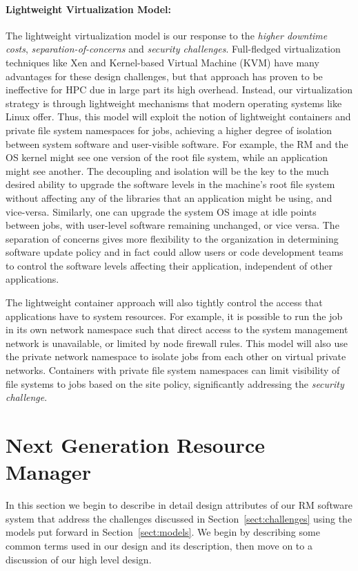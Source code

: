 \documentclass{article}
\begin{document}
\paragraph{Lightweight Virtualization Model:}
The lightweight virtualization model is our response to 
the {\sl higher downtime costs}, {\sl separation-of-concerns} and
{\sl security challenges}. Full-fledged virtualization techniques like Xen and
Kernel-based Virtual Machine (KVM) have many advantages for these design challenges, but
that approach has proven to be ineffective for HPC due in large part
its high overhead. Instead, our virtualization strategy is through lightweight
mechanisms that modern operating systems like Linux offer.  Thus,
this model will exploit the notion of lightweight containers and private
file system namespaces for jobs, achieving a higher degree of isolation
between system software and user-visible software. For example, the RM
and the OS kernel might see one version of the root file system, while
an application might see another. The decoupling and isolation will be
the key to the much desired ability to upgrade the software levels in the
machine's root file system without affecting any of the libraries that
an application might be using, and vice-versa. Similarly, one can upgrade
the system OS image at idle points between jobs, with user-level software
remaining unchanged, or vice versa. The separation of concerns gives more
flexibility to the organization in determining software update policy
and in fact could allow users or code development teams to control the
software levels affecting their application, independent of other
applications.


The lightweight container approach will also tightly control the access
that applications have to system resources. For example, it is possible to
run the job in its own network namespace such that direct access to the
system management network is unavailable, or limited by node firewall
rules. This model will  also use the private network namespace to isolate
jobs from each other on virtual private networks.
Containers with private file system namespaces can limit visibility of
file systems to jobs based on the site policy, significantly addressing
the {\sl security challenge}.


\section{Next Generation Resource Manager}
\label{sect:ngrm}

In this section we begin to describe in detail design attributes
of our RM software system that address the challenges discussed in
Section~\ref{sect:challenges} using the models put forward in
Section~\ref{sect:models}. We begin by describing some common terms
used in our design and its description, then move on to a discussion
of our high level design.
\end{document}
